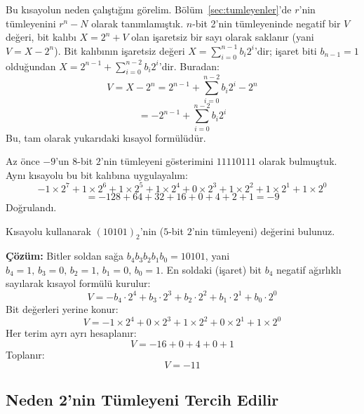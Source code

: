 Bu kısayolun neden çalıştığını görelim. Bölüm~\ref{sec:tumleyenler}'de $r$'nin tümleyenini
$r^n-N$ olarak tanımlamıştık. $n$-bit 2'nin tümleyeninde negatif bir $V$ değeri, bit
kalıbı $X=2^n+V$ olan işaretsiz bir sayı olarak saklanır (yani $V=X-2^n$). Bit kalıbının
işaretsiz değeri $X=\sum_{i=0}^{n-1}b_i2^i$'dir; işaret biti $b_{n-1}=1$ olduğundan
$X=2^{n-1}+\sum_{i=0}^{n-2}b_i2^i$'dir. Buradan:
\[
V=X-2^n=2^{n-1}+\sum_{i=0}^{n-2}b_i2^i-2^n
\]
\[
=-2^{n-1}+\sum_{i=0}^{n-2}b_i2^i
\]
Bu, tam olarak yukarıdaki kısayol formülüdür.

\begin{ornek}
Az önce $-9$'un $8$-bit $2$'nin tümleyeni gösterimini $11110111$ olarak bulmuştuk. Aynı
kısayolu bu bit kalıbına uygulayalım:
\[
-1\times2^7+1\times2^6+1\times2^5+1\times2^4+0\times2^3+1\times2^2+1\times2^1+1\times2^0
\]
\[
=-128+64+32+16+0+4+2+1=-9
\]
Doğrulandı.
\end{ornek}

\begin{alistirma}[\kolay]
Kısayolu kullanarak $(10101)_2$'nin ($5$-bit $2$'nin tümleyeni) değerini bulunuz.
\end{alistirma}

\noindent\textbf{Çözüm:} Bitler soldan sağa $b_4b_3b_2b_1b_0=10101$, yani
$b_4{=}1,\,b_3{=}0,\,b_2{=}1,\,b_1{=}0,\,b_0{=}1$. En soldaki (işaret) bit $b_4$ negatif
ağırlıklı sayılarak kısayol formülü kurulur:
\[
V = -b_4\cdot2^4+b_3\cdot2^3+b_2\cdot2^2+b_1\cdot2^1+b_0\cdot2^0
\]
Bit değerleri yerine konur:
\[
V = -1\times2^4+0\times2^3+1\times2^2+0\times2^1+1\times2^0
\]
Her terim ayrı ayrı hesaplanır:
\[
V = -16+0+4+0+1
\]
Toplanır:
\[
V = -11
\]

\subsection{Neden 2'nin Tümleyeni Tercih Edilir}
\label{sec:neden-2-tumleyeni}

